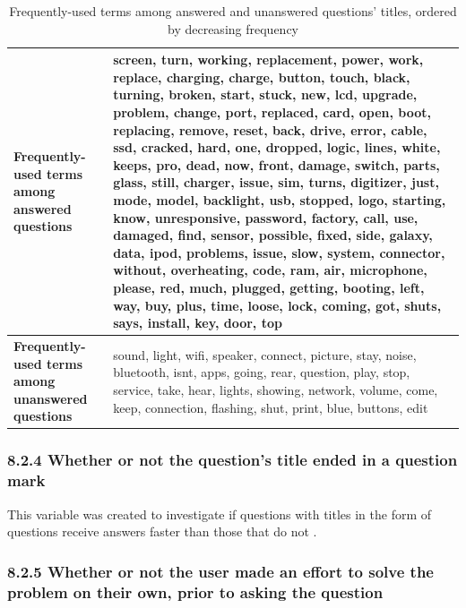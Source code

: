 \documentclass{article}
\begin{document}
\begin{table}[!htbp]
\centering
\begin{tabular}{|p{4cm}|p{8cm}|}
  \hline
 \textbf{Frequently-used terms among answered questions} & screen, turn, working, replacement, power, work, replace, charging, charge, button, touch, black, turning, broken, start, stuck, new, lcd, upgrade, problem, change, port, replaced, card, open, boot, replacing, remove, reset, back, drive, error, cable, ssd, cracked, hard, one, dropped, logic, lines, white, keeps, pro, dead, now, front, damage, switch, parts, glass, still, charger, issue, sim, turns, digitizer, just, mode, model, backlight, usb, stopped, logo, starting, know, unresponsive, password, factory, call, use, damaged, find, sensor, possible, fixed, side, galaxy, data, ipod, problems, issue, slow, system, connector, without, overheating, code, ram, air, microphone, please, red, much, plugged, getting, booting, left, way, buy, plus, time, loose, lock, coming, got, shuts, says, install, key, door, top \\
  \hline
  \textbf{Frequently-used terms among unanswered questions} & sound, light, wifi, speaker, connect, picture, stay, noise, bluetooth, isnt, apps, going, rear, question, play, stop, service, take, hear, lights, showing, network, volume, come, keep, connection, flashing, shut, print, blue, buttons, edit \\ 
   \hline
\end{tabular}
\caption{Frequently-used terms among answered and unanswered questions' titles, ordered by decreasing frequency}
\label{table:frequent_terms}
\end{table}


\subsubsection*{8.2.4 Whether or not the question's title ended in a question mark}

This variable was created to investigate if questions with titles in the form of questions receive answers faster than those that do not \cite{Bhat2014}. 


\subsubsection*{8.2.5 Whether or not the user made an effort to solve the problem on their own, prior to asking the question}
\end{document}
